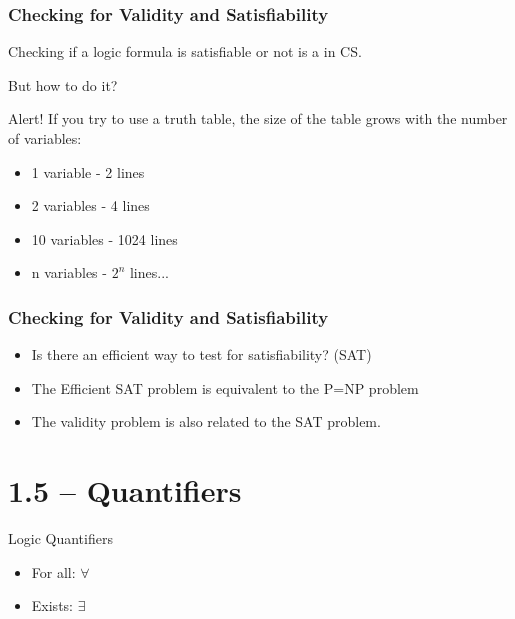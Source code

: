 \documentclass{beamer}
\begin{document}
\begin{frame}
  \frametitle{Checking for Validity and Satisfiability}

  Checking if a logic formula is satisfiable or not is a
   in CS.

  \bigskip

  But how to do it?

  \bigskip

  \alert{Alert!} If you try to use a truth table, the size of the
  table grows with the number of variables:
  \begin{itemize}
  \item 1 variable - 2 lines
  \item 2 variables - 4 lines
  \item 10 variables - 1024 lines
  \item n variables - $2^n$ lines...
  \end{itemize}
\end{frame}

\begin{frame}
  \frametitle{Checking for Validity and Satisfiability}
  \begin{itemize}
  \item Is there an efficient way to test for satisfiability? (SAT)
    \bigskip

  \item The Efficient SAT problem is equivalent to the P=NP problem
    \bigskip

  \item The validity problem is also related to the SAT problem.
  \end{itemize}
\end{frame}

\section{1.5 -- Quantifiers}
\begin{frame}
  \begin{center}
    Logic Quantifiers
  \end{center}

  \bigskip
  \begin{itemize}
  \item For all: $\forall$
  \item Exists: $\exists$
  \end{itemize}
\end{frame}
\end{document}
